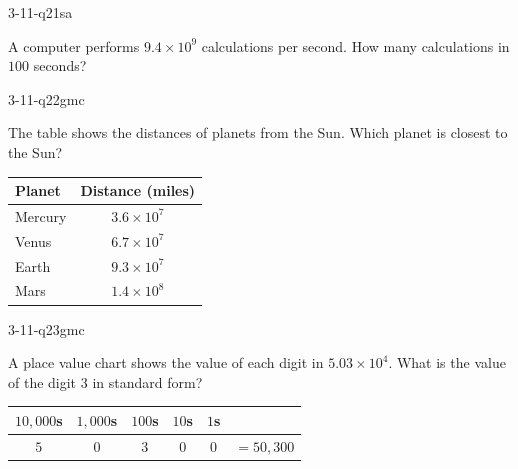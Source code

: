 \begin{practiceQuestion}{3-11-q21}{sa}
\begin{questionText}
A computer performs $9.4 \times 10^9$ calculations per second. How many calculations in $100$ seconds?
\end{questionText}
\end{practiceQuestion}


\begin{practiceQuestion}{3-11-q22}{gmc}
\begin{questionText}
The table shows the distances of planets from the Sun. Which planet is closest to the Sun?

\begin{center}
\begin{tabular}{|l|c|}
\hline
\textbf{Planet} & \textbf{Distance (miles)} \\
\hline
Mercury & $3.6 \times 10^7$ \\ \hline
Venus & $6.7 \times 10^7$ \\ \hline
Earth & $9.3 \times 10^7$ \\ \hline
Mars & $1.4 \times 10^8$ \\ \hline
\end{tabular}
\end{center}
\end{questionText}
\end{practiceQuestion}

\begin{practiceQuestion}{3-11-q23}{gmc}
\begin{questionText}
A place value chart shows the value of each digit in $5.03 \times 10^4$. What is the value of the digit $3$ in standard form?

\begin{center}
\begin{tabular}{|c|c|c|c|c|c|}
\hline
$10{,}000$s & $1{,}000$s & $100$s & $10$s & $1$s & \\ \hline
$5$ & $0$ & $3$ & $0$ & $0$ & $= 50{,}300$ \\ \hline
\end{tabular}
\end{center}
\end{questionText}
\end{practiceQuestion}

